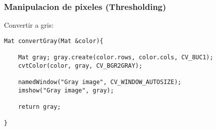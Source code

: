 \begin{frame}[fragile]
   \frametitle{Manipulacion de pixeles (Thresholding)}

   Convertir a gris:

    \scriptsize

    \begin{lstlisting}
Mat convertGray(Mat &color){

    Mat gray; gray.create(color.rows, color.cols, CV_8UC1);
    cvtColor(color, gray, CV_BGR2GRAY);

    namedWindow("Gray image", CV_WINDOW_AUTOSIZE);
    imshow("Gray image", gray);

    return gray;

}

    \end{lstlisting}

\end{frame}
